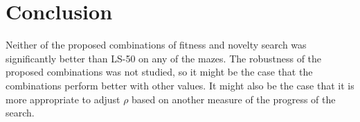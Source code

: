 \section{Conclusion}
\label{sec:conclusion}
Neither of the proposed combinations of fitness and novelty search was significantly better
than LS-50 on any of the mazes. The robustness of the proposed combinations was not studied, so
it might be the case that the combinations perform better with other values. It might also be the
case that it is more appropriate to adjust $\rho$ based on another measure of the progress of
the search.